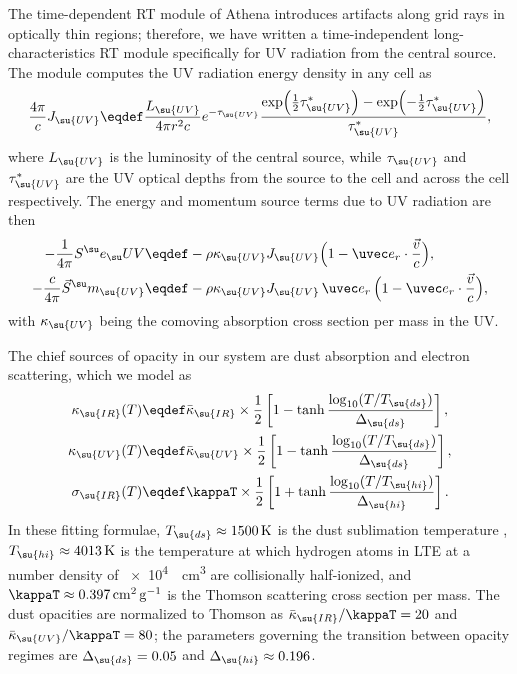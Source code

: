 \documentclass[twocolumn]{article}
\newcommand*\momsrc[1]{\vec S^\su m_\su{#1}}
\begin{document}
The time-dependent \ac{RT} module of Athena introduces artifacts along grid
rays in optically thin regions; therefore, we have written a time-independent
long-characteristics \ac{RT} module specifically for \ac{UV} radiation from the
central source. The module computes the \ac{UV} radiation energy density in any
cell as
\begin{equation}
\frac{4\pi}cJ_\su{UV}\eqdef\frac{L_\su{UV}}{4\pi r^2c}e^{-\tau_\su{UV}}
  \frac{\exp(\tfrac12\tau^*_\su{UV})-\exp(-\tfrac12\tau^*_\su{UV})}
  {\tau^*_\su{UV}},
\end{equation}
where $L_\su{UV}$ is the luminosity of the central source, while $\tau_\su{UV}$
and $\tau^*_\su{UV}$ are the \ac{UV} optical depths from the source to the cell
and across the cell respectively. The energy and momentum source terms due to
\ac{UV} radiation are then
\begin{align}
\label{eq:UV energy source}
-\frac1{4\pi}\ergsrc{UV} &\eqdef
  -\rho\kappa_\su{UV}J_\su{UV}\Bigl(1-\uvec e_r\cdot\frac{\vec v}c\Bigr), \\
\label{eq:UV momentum source}
-\frac c{4\pi}\momsrc{UV} &\eqdef
  -\rho\kappa_\su{UV}J_\su{UV}\,\uvec e_r\,
  \Bigl(1-\uvec e_r\cdot\frac{\vec v}c\Bigr),
\end{align}
with $\kappa_\su{UV}$ being the comoving absorption cross section per mass in
the \ac{UV}.

The chief sources of opacity in our system are dust absorption and electron
scattering, which we model as
\begin{align}
\kappa_\su{IR}(T) &\eqdef \bar\kappa_\su{IR}\times
  \frac12\left[1-\tanh\frac{\log_{10}(T/T_\su{ds})}{\Delta_\su{ds}}\right], \\
\label{eq:UV opacity}
\kappa_\su{UV}(T) &\eqdef \bar\kappa_\su{UV}\times
  \frac12\left[1-\tanh\frac{\log_{10}(T/T_\su{ds})}{\Delta_\su{ds}}\right], \\
\sigma_\su{IR}(T) &\eqdef \kappaT\times
  \frac12\left[1+\tanh\frac{\log_{10}(T/T_\su{hi})}{\Delta_\su{hi}}\right].
\end{align}
In these fitting formulae, $T_\su{ds}\approx\SI{1500}{\kelvin}$ is the dust
sublimation temperature \citep[e.g.,][]{1969Natur.223..788R,
1981ApJ...250...87R, 1987ApJ...320..537B}, $T_\su{hi}\approx\SI{4013}{\kelvin}$
is the temperature at which hydrogen atoms in \ac{LTE} at a number density of
\SI{e4}{\per\cubic\centi\meter} are collisionally half-ionized, and
$\kappaT\approx\SI{0.397}{\centi\meter\squared\per\gram}$ is the Thomson
scattering cross section per mass. The dust opacities are normalized to Thomson
as $\bar\kappa_\su{IR}/\kappaT=20$ and $\bar\kappa_\su{UV}/\kappaT=80$; the
parameters governing the transition between opacity regimes are
$\Delta_\su{ds}=0.05$ and $\Delta_\su{hi}\approx0.196$.
\end{document}
